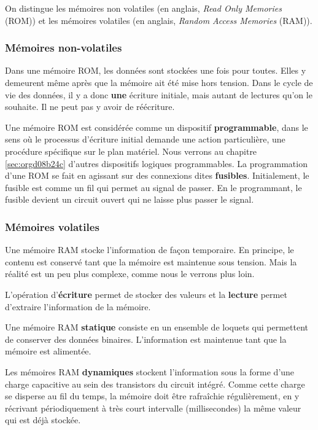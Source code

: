 \documentclass[11pt]{article}
\begin{document}
On distingue les mémoires non volatiles (en anglais, \emph{Read Only
Memories} (ROM)) et les mémoires volatiles (en anglais, \emph{Random Access
Memories} (RAM)).

\subsubsection{Mémoires non-volatiles}
\label{sec:orgfc8a263}

Dans une mémoire ROM, les données sont stockées une fois pour
toutes. Elles y demeurent même après que la mémoire ait été mise hors
tension. Dans le cycle de vie des données, il y a donc \textbf{une} écriture
initiale, mais autant de lectures qu'on le souhaite. Il ne peut pas y
avoir de réécriture.

Une mémoire ROM est considérée comme un dispositif \textbf{programmable},
dans le sens où le processus d'écriture initial demande une action
particulière, une procédure spécifique sur le plan matériel. Nous verrons
au chapitre \ref{sec:orgd08b24c} d'autres dispositifs logiques
programmables. La programmation d'une ROM se fait en agissant sur des
connexions dites \textbf{fusibles}. Initialement, le fusible est comme un fil
qui permet au signal de passer. En le programmant, le fusible devient
un circuit ouvert qui ne laisse plus passer le signal.

\subsubsection{Mémoires volatiles}
\label{sec:org5e959f0}

Une mémoire RAM stocke l'information de façon temporaire. En principe,
le contenu est conservé tant que la mémoire est maintenue sous
tension. Mais la réalité est un peu plus complexe, comme nous le verrons
plus loin.

L'opération d'\textbf{écriture} permet de stocker des valeurs et la
\textbf{lecture} permet d'extraire l'information de la mémoire.

Une mémoire RAM \textbf{statique} consiste en un ensemble de loquets qui
permettent de conserver des données binaires. L'information est
maintenue tant que la mémoire est alimentée. 

Les mémoires RAM \textbf{dynamiques} stockent l'information sous la forme
d'une charge capacitive au sein des transistors du circuit
intégré. Comme cette charge se disperse au fil du temps, la mémoire
doit être rafraîchie régulièrement, en y récrivant périodiquement à
très court intervalle (millisecondes) la même valeur qui est déjà
stockée.
\end{document}
